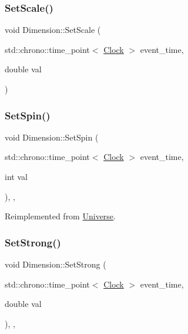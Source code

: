 \mbox{\label{classDimension_a7f655ea002e8f9614a8c5cfa1807c49c}} 
\subsubsection{\texorpdfstring{Set\+Scale()}{SetScale()}}
{\footnotesize\ttfamily void Dimension\+::\+Set\+Scale (\begin{DoxyParamCaption}\item[{std\+::chrono\+::time\+\_\+point$<$ \mbox{\hyperlink{universe_8h_a0ef8d951d1ca5ab3cfaf7ab4c7a6fd80}{Clock}} $>$}]{event\+\_\+time,  }\item[{double}]{val }\end{DoxyParamCaption})}

\mbox{\label{classDimension_a8d73c050c67b0226572b4a1b08ae6594}} 
\subsubsection{\texorpdfstring{Set\+Spin()}{SetSpin()}}
{\footnotesize\ttfamily void Dimension\+::\+Set\+Spin (\begin{DoxyParamCaption}\item[{std\+::chrono\+::time\+\_\+point$<$ \mbox{\hyperlink{universe_8h_a0ef8d951d1ca5ab3cfaf7ab4c7a6fd80}{Clock}} $>$}]{event\+\_\+time,  }\item[{int}]{val }\end{DoxyParamCaption})\hspace{0.3cm}{\ttfamily [inline]}, {\ttfamily [final]}, {\ttfamily [virtual]}}



Reimplemented from \mbox{\hyperlink{classUniverse_ae2ae1c3b3e4cde2c18f5f6a814761ec8}{Universe}}.

\mbox{\label{classDimension_ab9021cb6727ed590026bf870c638576d}} 
\subsubsection{\texorpdfstring{Set\+Strong()}{SetStrong()}}
{\footnotesize\ttfamily void Dimension\+::\+Set\+Strong (\begin{DoxyParamCaption}\item[{std\+::chrono\+::time\+\_\+point$<$ \mbox{\hyperlink{universe_8h_a0ef8d951d1ca5ab3cfaf7ab4c7a6fd80}{Clock}} $>$}]{event\+\_\+time,  }\item[{double}]{val }\end{DoxyParamCaption})\hspace{0.3cm}{\ttfamily [inline]}, {\ttfamily [final]}, {\ttfamily [virtual]}}



